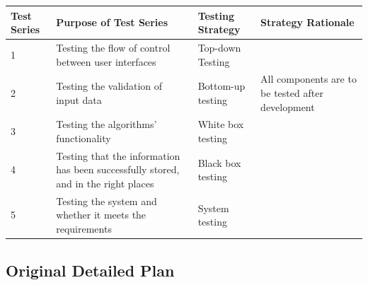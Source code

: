 \begin{landscape}
\begin{center}
    \begin{tabular}{|p{2cm}|p{5cm}|p{5cm}|p{4cm}|}
        \hline
        \textbf{Test Series} & \textbf{Purpose of Test Series} & \textbf{Testing Strategy} & \textbf{Strategy Rationale}\\ \hline 
        1 & Testing the flow of control between user interfaces & Top-down Testing & \\ \hline
        2 & Testing the validation of input data & Bottom-up testing & All components are to be tested after development \\ \hline
        3 & Testing the algorithms' functionality & White box testing & \\ \hline
        4 & Testing that the information has been successfully stored, and in the right places & Black box testing & \\ \hline
        5 & Testing the system and whether it meets the requirements & System testing & \\ \hline
    \end{tabular}
\end{center}

\subsection{Original Detailed Plan}



\end{landscape}
